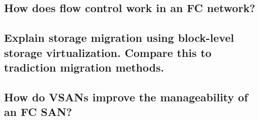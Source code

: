 \subsection{How does flow control work in an FC network?} %
\label{sub:how_does_flow_control_work_in_an_fc_network}


\subsection{Explain storage migration using block-level storage virtualization. Compare this to tradiction migration methods.} %
\label{sub:explain_storage_migration_using_block_level_storage_virtualization_compare_this_to_tradiction_migration_methods_}


\subsection{How do VSANs improve the manageability of an FC SAN?} %
\label{sub:how_do_vsans_improve_the_manageability_of_an_fc_san}



